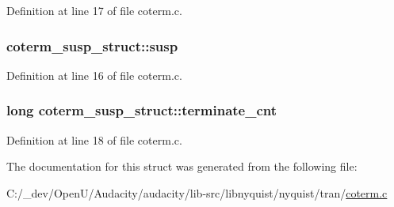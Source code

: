 Definition at line 17 of file coterm.\+c.

\subsubsection[{\texorpdfstring{susp}{susp}}]{ coterm\+\_\+susp\+\_\+struct\+::susp}\hypertarget{structcoterm__susp__struct_ad448c0d291f1010e168748f3f7f74631}{}\label{structcoterm__susp__struct_ad448c0d291f1010e168748f3f7f74631}


Definition at line 16 of file coterm.\+c.

\subsubsection[{\texorpdfstring{terminate\+\_\+cnt}{terminate_cnt}}]{\setlength{\rightskip}{0pt plus 5cm}long coterm\+\_\+susp\+\_\+struct\+::terminate\+\_\+cnt}\hypertarget{structcoterm__susp__struct_aaccfa664ccdec62b824145012e76c2e7}{}\label{structcoterm__susp__struct_aaccfa664ccdec62b824145012e76c2e7}


Definition at line 18 of file coterm.\+c.



The documentation for this struct was generated from the following file\+:\begin{DoxyCompactItemize}
\item 
C\+:/\+\_\+dev/\+Open\+U/\+Audacity/audacity/lib-\/src/libnyquist/nyquist/tran/\hyperlink{coterm_8c}{coterm.\+c}\end{DoxyCompactItemize}
